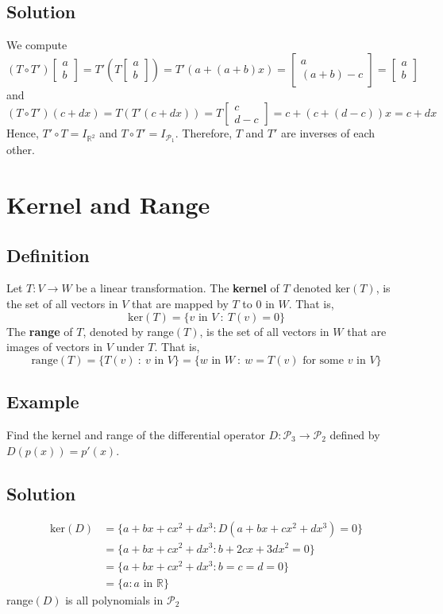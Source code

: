 \subsection*{Solution}
We compute
\[(T\circ T')\begin{bmatrix}
        a \\b
    \end{bmatrix}=T'\left(T\begin{bmatrix}
            a \\b
        \end{bmatrix}\right)=T'(a+(a+b)x)=\begin{bmatrix}
        a \\
        (a+b)-c
    \end{bmatrix}=\begin{bmatrix}
        a \\b
    \end{bmatrix}\]
and
\[(T\circ T')(c+dx)=T(T'(c+dx))=T\begin{bmatrix}
        c \\
        d-c
    \end{bmatrix}=c+(c+(d-c))x=c+dx\]
Hence, $T'\circ T=I_{\mathbb{R}^2}$ and $T\circ T'=I_{\mathscr{P}_1}$. Therefore,
$T$ and $T'$ are inverses of each other.

\section{Kernel and Range}

\subsection*{Definition}
Let $T:V\to W$ be a linear transformation. The \textbf{kernel} of $T$ denoted
ker$(T)$, is the set of all vectors in $V$ that are mapped by $T$ to 0 in $W$. That is,
\[\text{ker}(T)=\{v\text{ in }V\::\:T(v)=0\}\]
The \textbf{range} of $T$, denoted by range$(T)$, is the set of all vectors in $W$
that are images of vectors in $V$ under $T$. That is,
\[\text{range}(T)=\{T(v)\::\:v\text{ in }V\}=\{w\text{ in }W\::\:w=T(v)\text{ for some }v\text{ in }V\}\]

\subsection*{Example}
Find the kernel and range of the differential operator $D:\mathscr{P}_3\to\mathscr{P}_2$
defined by $D(p(x)) = p'(x)$.

\subsection*{Solution}
\begin{align*}
    \text{ker}(D) & =\{a+bx+cx^2+dx^3:D(a+bx+cx^2+dx^3)=0\} \\
                  & =\{a+bx+cx^2+dx^3:b+2cx+3dx^2=0\}       \\
                  & =\{a+bx+cx^2+dx^3:b=c=d=0\}             \\
                  & =\{a:a\text{ in }\mathbb{R}\}
\end{align*}
range$(D)$ is all polynomials in $\mathscr{P}_2$

